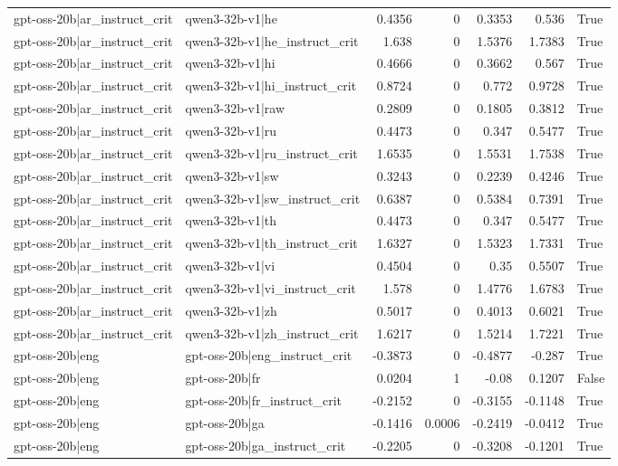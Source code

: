 \begin{table}
\begin{tabular}{l l r r r r l}
gpt-oss-20b|ar_instruct_crit & qwen3-32b-v1|he & 0.4356 & 0 & 0.3353 & 0.536 & True \\
gpt-oss-20b|ar_instruct_crit & qwen3-32b-v1|he_instruct_crit & 1.638 & 0 & 1.5376 & 1.7383 & True \\
gpt-oss-20b|ar_instruct_crit & qwen3-32b-v1|hi & 0.4666 & 0 & 0.3662 & 0.567 & True \\
gpt-oss-20b|ar_instruct_crit & qwen3-32b-v1|hi_instruct_crit & 0.8724 & 0 & 0.772 & 0.9728 & True \\
gpt-oss-20b|ar_instruct_crit & qwen3-32b-v1|raw & 0.2809 & 0 & 0.1805 & 0.3812 & True \\
gpt-oss-20b|ar_instruct_crit & qwen3-32b-v1|ru & 0.4473 & 0 & 0.347 & 0.5477 & True \\
gpt-oss-20b|ar_instruct_crit & qwen3-32b-v1|ru_instruct_crit & 1.6535 & 0 & 1.5531 & 1.7538 & True \\
gpt-oss-20b|ar_instruct_crit & qwen3-32b-v1|sw & 0.3243 & 0 & 0.2239 & 0.4246 & True \\
gpt-oss-20b|ar_instruct_crit & qwen3-32b-v1|sw_instruct_crit & 0.6387 & 0 & 0.5384 & 0.7391 & True \\
gpt-oss-20b|ar_instruct_crit & qwen3-32b-v1|th & 0.4473 & 0 & 0.347 & 0.5477 & True \\
gpt-oss-20b|ar_instruct_crit & qwen3-32b-v1|th_instruct_crit & 1.6327 & 0 & 1.5323 & 1.7331 & True \\
gpt-oss-20b|ar_instruct_crit & qwen3-32b-v1|vi & 0.4504 & 0 & 0.35 & 0.5507 & True \\
gpt-oss-20b|ar_instruct_crit & qwen3-32b-v1|vi_instruct_crit & 1.578 & 0 & 1.4776 & 1.6783 & True \\
gpt-oss-20b|ar_instruct_crit & qwen3-32b-v1|zh & 0.5017 & 0 & 0.4013 & 0.6021 & True \\
gpt-oss-20b|ar_instruct_crit & qwen3-32b-v1|zh_instruct_crit & 1.6217 & 0 & 1.5214 & 1.7221 & True \\
gpt-oss-20b|eng & gpt-oss-20b|eng_instruct_crit & -0.3873 & 0 & -0.4877 & -0.287 & True \\
gpt-oss-20b|eng & gpt-oss-20b|fr & 0.0204 & 1 & -0.08 & 0.1207 & False \\
gpt-oss-20b|eng & gpt-oss-20b|fr_instruct_crit & -0.2152 & 0 & -0.3155 & -0.1148 & True \\
gpt-oss-20b|eng & gpt-oss-20b|ga & -0.1416 & 0.0006 & -0.2419 & -0.0412 & True \\
gpt-oss-20b|eng & gpt-oss-20b|ga_instruct_crit & -0.2205 & 0 & -0.3208 & -0.1201 & True \\

\end{tabular}
\end{table}
